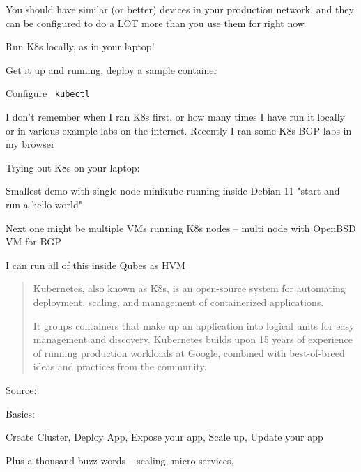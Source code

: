 \documentclass[Screen16to9,17pt]{foils}
\begin{document}
You should have similar (or better) devices in your production network, and they can be
configured to do a LOT more than you use them for right now





\begin{list2}
\item Run K8s locally, as in your laptop!
\item Get it up and running, deploy a sample container
\item Configure \faWrench\ \verb+kubectl+
\end{list2}

I don't remember when I ran K8s first, or how many times I have run it locally or in various example labs on the internet. Recently I ran some K8s BGP labs in my browser

Trying out K8s on your laptop:

\begin{list2}
\item Smallest demo with single node minikube running inside Debian 11
    "start and run a hello world"
\item Next one might be multiple VMs running K8s nodes -- multi node with OpenBSD VM for BGP
\item I can run all of this inside Qubes as HVM
\end{list2}



\begin{quote}
Kubernetes, also known as K8s, is an open-source system for automating deployment, scaling, and management of containerized applications.

It groups containers that make up an application into logical units for easy management and discovery. Kubernetes builds upon 15 years of experience of running production workloads at Google, combined with best-of-breed ideas and practices from the community.
\end{quote}
Source: 

Basics:
\begin{list2}
\item Create Cluster, Deploy App, Expose your app, Scale up, Update your app

\item Plus a thousand buzz words -- scaling, micro-services,
\end{list2}
\end{document}
